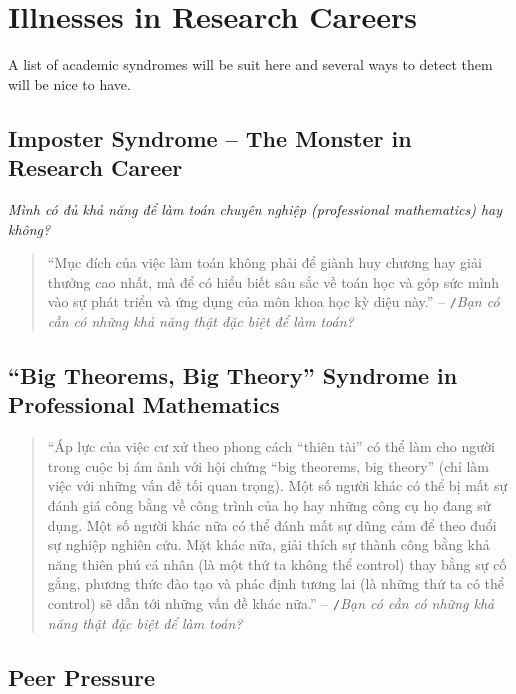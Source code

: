\documentclass{article}
\numberwithin{equation}{section}
\begin{document}
\section{Illnesses in Research Careers}
A list of academic syndromes will be suit here and several ways to detect them will be nice to have.

\subsection{Imposter Syndrome -- The Monster in Research Career}
\textit{Mình có đủ khả năng để làm toán chuyên nghiệp (professional mathematics) hay không?}
\begin{quotation}
	``Mục đích của việc làm toán không phải để giành huy chương hay giải thưởng cao nhất, mà để có hiểu biết sâu sắc về toán học và góp sức mình vào sự phát triển và ứng dụng của môn khoa học kỳ diệu này.'' -- \cite{VHV's blog}\texttt{/}\textit{Bạn có cần có những khả năng thật đặc biệt để làm toán?}
\end{quotation}

\subsection{``Big Theorems, Big Theory'' Syndrome in Professional Mathematics}
\begin{quotation}
	``Áp lực của việc cư xử theo phong cách ``thiên tài'' có thể làm cho người trong cuộc bị ám ảnh với hội chứng ``big theorems, big theory'' (chỉ làm việc với những vấn đề tối quan trọng). Một số người khác có thể bị mất sự đánh giá công bằng về công trình của họ hay những công cụ họ đang sử dụng. Một số người khác nữa có thể đánh mất sự dũng cảm để theo đuổi sự nghiệp nghiên cứu. Mặt khác nữa, giải thích sự thành công bằng khả năng thiên phú cá nhân (là một thứ ta không thể control) thay bằng sự cố gắng, phương thức đào tạo và phác định tương lai (là những thứ ta có thể control) sẽ dẫn tới những vấn đề khác nữa.'' -- \cite{VHV's blog}\texttt{/}\textit{Bạn có cần có những khả năng thật đặc biệt để làm toán?}
\end{quotation}
\subsection{Peer Pressure}
\end{document}
